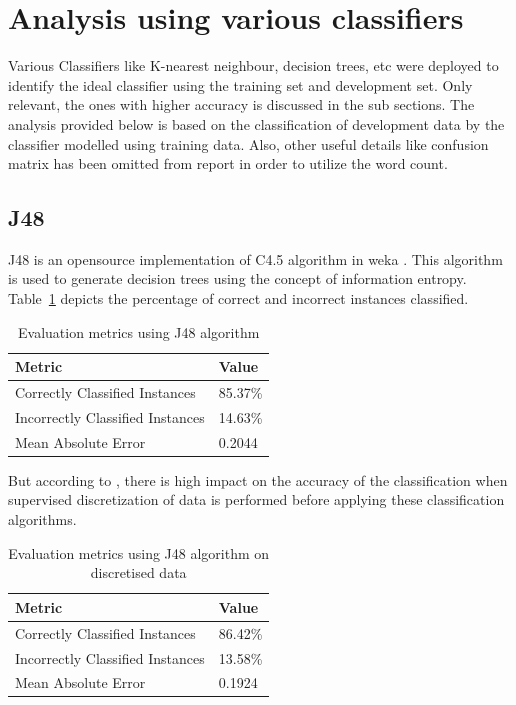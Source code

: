 \documentclass[11pt]{article}
\begin{document}
\section {Analysis using various classifiers}
Various Classifiers like K-nearest neighbour, decision trees, etc were deployed to identify the ideal classifier using the training set and development set. Only relevant, the ones with higher accuracy is discussed in the sub sections. The analysis provided below is based on the classification of development data by the classifier modelled using training data. Also, other useful details like confusion matrix has been omitted from report in order to utilize the word count. 

\subsection{J48}
J48 is an opensource implementation of C4.5 algorithm in weka . This algorithm is used to generate decision trees using the concept of information entropy. Table~\ref{table-1} depicts the percentage of correct and incorrect instances classified.

\begin{table}[h]
 \begin{center}
\begin{tabular}{|l|l|}

	\hline
     Metric & Value  \\
     \hline\hline
     Correctly Classified Instances & 85.37\% \\
	 Incorrectly Classified Instances & 14.63\% \\
	 Mean Absolute Error& 0.2044 \\
     \hline
     
 \end{tabular}
\caption{Evaluation metrics using J48 algorithm}\label{table-1}
 \end{center}
\end{table}

But according to , there is high impact on the accuracy of the classification when supervised discretization of data is performed before applying these classification algorithms.   

\begin{table}[h]
 \begin{center}
\begin{tabular}{|l|l|}

	\hline
     Metric & Value  \\
     \hline\hline
     Correctly Classified Instances & 86.42\% \\
	 Incorrectly Classified Instances & 13.58\% \\
	 Mean Absolute Error& 0.1924 \\
     \hline
     
 \end{tabular}
\caption{Evaluation metrics using J48 algorithm on discretised data}\label{table-2}
 \end{center}
\end{table}
\end{document}
